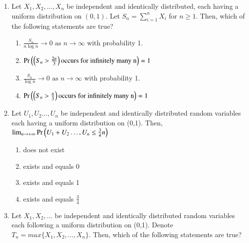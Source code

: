 \begin{enumerate}[label=\thesection.\arabic*.,ref=\thesection.\theenumi]
% 
%
\item Let $X_1,X_2,...,X_n$ be independent and identically distributed, each having a uniform distribution on $(0,1)$. Let $S_n=\sum_{i=1}^{n}X_i$ for $n\ge 1$. Then, which of the following statements are true? 
\begin{enumerate}[label=\Alph*)]
\item $\frac{S_n}{n \log{n}}\to 0 \text{ as } n \to \infty$ with probability 1.
\item $\Pr\left(\left(S_n>\frac{2n}{3}\right)\text{occurs for infinitely many n}\right)=1$
\item $\frac{S_n}{\log{n}}\to 0\text{ as } n \to \infty$ with probability 1.
\item $\Pr\left(\left(S_n>\frac{n}{3}\right)\text{occurs for infinitely many n}\right)=1$
\end{enumerate}
%
\solution

%
%
\item Let $U_1,U_2\dots,U_n$ be independent and identically distributed random variables each
having a uniform distribution on (0,1). Then,$\lim_{n \to +\infty} \Pr\left(U_1+U_2\dots,U_n\leq \frac{3}{4}n\right)$
\begin{enumerate}
    \item does not exist
    \item exists and equals 0
    \item exists and equals 1
    \item exists and equals $\frac{3}{4}$
\end{enumerate}
%
\solution

%
%
\item Let $X_{1},X_{2},\dots$ be independent and identically distributed random variables each following a uniform distribution on (0,1). Denote $T_{n}=max\{ X_{1},X_{2},\dots,X_{n}\}$. Then, which of the following statements are true?

\end{enumerate}
